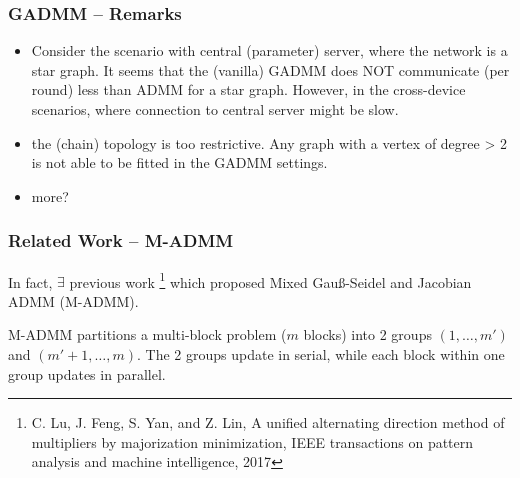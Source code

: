 
\begin{frame}
\frametitle{GADMM -- Remarks}

\begin{itemize}
    \item Consider the scenario with central (parameter) server, where the network is a star graph. It seems that the (vanilla) GADMM does {\color{red} NOT} communicate (per round) less than ADMM for a star graph. However, in the cross-device scenarios, where connection to central server might be slow.
    \item the (chain) topology is too restrictive. Any graph with a vertex of degree > 2 is not able to be fitted in the GADMM settings.
    \item more?
\end{itemize}

\end{frame}


\begin{frame}
\frametitle{Related Work -- M-ADMM}

In fact, $\exists$ previous work \cite{lu2017unified}\footnote{C. Lu, J. Feng, S. Yan, and Z. Lin, A unified alternating direction method of multipliers by majorization minimization, IEEE transactions on pattern analysis and machine intelligence, 2017} which proposed Mixed Gau\ss-Seidel and Jacobian ADMM (M-ADMM).

\vspace{0.6em}

M-ADMM partitions a {\color{red} multi-block problem} ($m$ blocks) into 2 groups $(1,\ldots,m')$ and $(m'+1,\ldots,m)$. The 2 groups update {\color{red} in serial}, while each block within one group updates {\color{red} in parallel}.

\end{frame}



